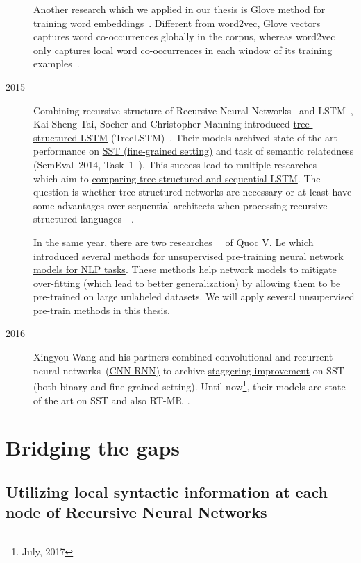 \begin{description}
Another research which we applied in our thesis is Glove method for training word embeddings~\cite{glove}.
Different from word2vec, Glove vectors captures word co-occurrences globally in the corpus, whereas word2vec only captures local word co-occurrences in each window of its training examples~\cite{glove}.

\item [2015] Combining recursive structure of Recursive Neural Networks~\cite{socher2013recursive} and LSTM~\cite{originLSTM}, Kai Sheng Tai, Socher and Christopher Manning introduced \hyperref[sec:treelstm]{tree-structured LSTM}  (TreeLSTM)~\cite{treeLSTM}.
Their models archived state of the art performance on \hyperref[sec:sst]{SST (fine-grained setting)} and task of semantic relatedness (SemEval~2014, Task~1~\cite{SemeEvalTask1}).
This success lead to multiple researches~\cite{need-tree}~\cite{bowman-treevslstm}~\cite{Graves_Nature2016} which aim to \hyperref[treelstm-advantage]{comparing tree-structured and sequential LSTM}. 
The question is whether tree-structured networks are necessary or at least have some advantages over sequential architects when processing recursive-structured languages~\cite{need-tree}~\cite{bowman-treevslstm}.   

In the same year, there are two researches~\cite{ParagraphVec}~\cite{semisup-seq2seq} of Quoc V. Le which introduced several methods for \hyperref[sec:unsupervised-pretrain]{unsupervised pre-training neural network models for NLP tasks}.
These methods help network models to mitigate over-fitting (which lead to better generalization) by allowing them to be pre-trained on large unlabeled datasets.
We will apply several unsupervised pre-train methods in this thesis.

\item [2016] Xingyou Wang and his partners combined convolutional and recurrent neural networks~\hyperref[cnn-rnn]{(CNN-RNN)} to archive \hyperref[table:cnn-rnn]{staggering improvement} on SST (both binary and fine-grained setting).
Until now\footnote{July, 2017}, their models are state of the art on SST and also RT-MR~\cite{cnn-rnn}.
\end{description}  

\section{Bridging the gaps}
\subsection{Utilizing local syntactic information at each node of Recursive Neural Networks}
